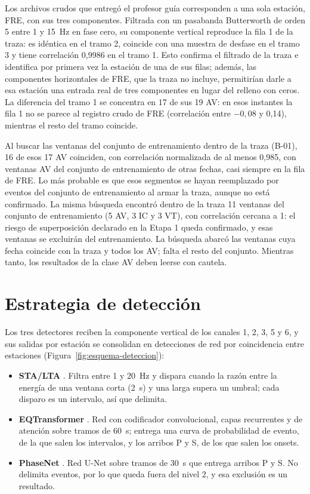 \documentclass[12pt,oneside,spanish,oldfontcommands]{memoir}
\begin{document}
Los archivos crudos que entregó el profesor guía corresponden a una sola
estación, FRE, con sus tres componentes. Filtrada con un pasabanda Butterworth
de orden 5 entre 1 y 15~Hz en fase cero, su componente vertical reproduce la
fila 1 de la traza: es idéntica en el tramo 2, coincide con una muestra de
desfase en el tramo 3 y tiene correlación 0,9986 en el tramo 1. Esto confirma
el filtrado de la traza e identifica por primera vez la estación de una de
sus filas; además, las componentes horizontales de FRE, que la traza no
incluye, permitirían darle a esa estación una entrada real de tres
componentes en lugar del relleno con ceros. La diferencia del tramo 1 se
concentra en 17 de sus 19 AV: en esos instantes la fila 1 no se parece al
registro crudo de FRE (correlación entre $-0{,}08$ y 0,14), mientras el resto
del tramo coincide.

Al buscar las ventanas del conjunto de entrenamiento dentro de la traza
(B-01), 16 de esos 17 AV coinciden, con correlación normalizada de al menos
0,985, con ventanas AV del conjunto de entrenamiento de otras fechas, casi
siempre en la fila de FRE. Lo más probable es que esos segmentos se hayan
reemplazado por eventos del conjunto de entrenamiento al armar la traza,
aunque no está confirmado. La misma búsqueda encontró dentro de la traza 11
ventanas del conjunto de entrenamiento (5 AV, 3 IC y 3 VT), con correlación
cercana a 1: el riesgo de superposición declarado en la Etapa 1 queda
confirmado, y esas ventanas se excluirán del entrenamiento. La búsqueda
abarcó las ventanas cuya fecha coincide con la traza y todos los AV; falta el
resto del conjunto. Mientras tanto, los resultados de la clase AV deben
leerse con cautela.

\section{Estrategia de detección}
\label{sec:det-estrategia}

Los tres detectores reciben la componente vertical de los canales 1, 2, 3, 5
y 6, y sus salidas por estación se consolidan en detecciones de red por
coincidencia entre estaciones (Figura~\ref{fig:esquema-deteccion}):

\begin{itemize}
\item \textbf{STA/LTA} \parencite{allen1978stalta}. Filtra entre 1 y 20~Hz y
dispara cuando la razón entre la energía de una ventana corta (2~s) y una
larga supera un umbral; cada disparo es un intervalo, así que delimita.
\item \textbf{EQTransformer} \parencite{mousavi2020eqtransformer}. Red con
codificador convolucional, capas recurrentes y de atención sobre tramos de
60~s; entrega una curva de probabilidad de evento, de la que salen los
intervalos, y los arribos P y S, de los que salen los onsets.
\item \textbf{PhaseNet} \parencite{zhu2019phasenet}. Red U-Net sobre tramos de
30~s que entrega arribos P y S. No delimita eventos, por lo que queda fuera
del nivel 2, y esa exclusión es un resultado.
\end{itemize}
\end{document}

